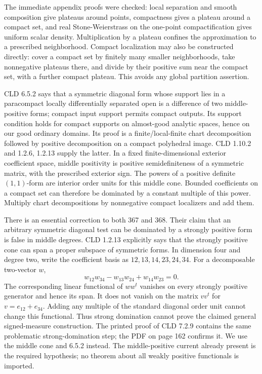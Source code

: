 \documentclass[11pt]{article}
\begin{document}
The immediate appendix proofs were checked: local separation and smooth composition give plateaus around points, compactness gives a plateau around a compact set, and real Stone-Weierstrass on the one-point compactification gives uniform scalar density. Multiplication by a plateau confines the approximation to a prescribed neighborhood. Compact localization may also be constructed directly: cover a compact set by finitely many smaller neighborhoods, take nonnegative plateaus there, and divide by their positive sum near the compact set, with a further compact plateau. This avoids any global partition assertion.

CLD 6.5.2 says that a symmetric diagonal form whose support lies in a paracompact locally differentially separated open is a difference of two middle-positive forms; compact input support permits compact outputs. Its support condition holds for compact supports on almost-good analytic spaces, hence on our good ordinary domains. Its proof is a finite/local-finite chart decomposition followed by positive decomposition on a compact polyhedral image. CLD 1.10.2 and 1.2.6, 1.2.13 supply the latter. In a fixed finite-dimensional exterior coefficient space, middle positivity is positive semidefiniteness of a symmetric matrix, with the prescribed exterior sign. The powers of a positive definite \((1,1)\)-form are interior order units for this middle cone. Bounded coefficients on a compact set can therefore be dominated by a constant multiple of this power. Multiply chart decompositions by nonnegative compact localizers and add them.

There is an essential correction to both 367 and 368. Their claim that an arbitrary symmetric diagonal test can be dominated by a strongly positive form is false in middle degrees. CLD 1.2.13 explicitly says that the strongly positive cone can span a proper subspace of symmetric forms. In dimension four and degree two, write the coefficient basis as \(12,13,14,23,24,34\). For a decomposable two-vector \(w\),
\[
 w_{12}w_{34}-w_{13}w_{24}+w_{14}w_{23}=0.
\]
The corresponding linear functional of \(ww^t\) vanishes on every strongly positive generator and hence its span. It does not vanish on the matrix \(vv^t\) for \(v=e_{12}+e_{34}\). Adding any multiple of the standard diagonal order unit cannot change this functional. Thus strong domination cannot prove the claimed general signed-measure construction. The printed proof of CLD 7.2.9 contains the same problematic strong-domination step; the PDF on page 162 confirms it. We use the middle cone and 6.5.2 instead. The middle-positive current already present is the required hypothesis; no theorem about all weakly positive functionals is imported.
\end{document}
